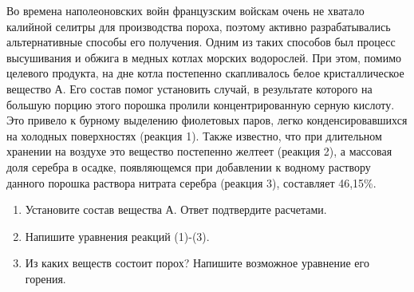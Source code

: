 
Во времена наполеоновских войн французским войскам очень не хватало калийной селитры для производства пороха, 
поэтому активно разрабатывались альтернативные способы его получения. Одним из таких способов был процесс 
высушивания и обжига в медных котлах морских водорослей. При этом, помимо целевого продукта, на дне котла 
постепенно скапливалось белое кристаллическое вещество А. Его состав помог установить случай, в результате 
которого на большую порцию этого порошка пролили концентрированную серную кислоту. Это привело к бурному 
выделению фиолетовых паров, легко конденсировавшихся на холодных поверхностях (реакция 1). Также известно, 
что при длительном хранении на воздухе это вещество постепенно желтеет (реакция 2), а массовая доля серебра 
в осадке, появляющемся при добавлении к водному раствору данного порошка раствора нитрата серебра (реакция 3), 
составляет 46,15\%.

\begin{enumerate}
    \item Установите состав вещества А. Ответ подтвердите расчетами.
    \item Напишите уравнения реакций (1)-(3).
    \item Из каких веществ состоит порох? Напишите возможное уравнение его горения.
\end{enumerate}